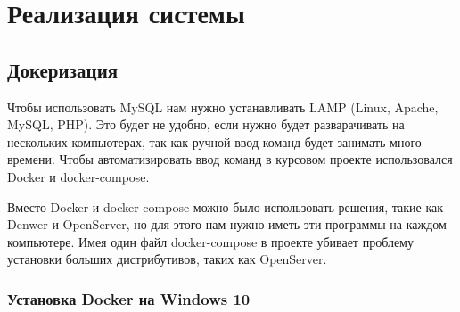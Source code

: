 \newpage

\section{Реализация системы}

\subsection{Докеризация}

Чтобы использовать MySQL нам нужно устанавливать LAMP (Linux, Apache, MySQL, PHP).
Это будет не удобно, если нужно будет разварачивать на нескольких компьютерах,
так как ручной ввод команд будет занимать много времени.
Чтобы автоматизировать ввод команд в курсовом проекте использовался Docker и docker-compose.

Вместо Docker и docker-compose можно было использовать решения, такие как Denwer и OpenServer,
но для этого нам нужно иметь эти программы на каждом компьютере. Имея один файл docker-compose
в проекте убивает проблему установки больших дистрибутивов, таких как OpenServer.

\subsubsection*{Установка Docker на Windows 10}

